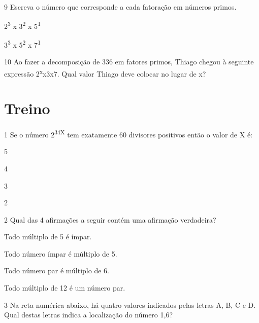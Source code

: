 \num{9} Escreva o número que corresponde a cada fatoração em números primos.

\begin{escolha}
\item 2\textsuperscript{3} x 3\textsuperscript{2} x 5\textsuperscript{1}  \\
\reduline{360\hfill}

\item 3\textsuperscript{3} x 5\textsuperscript{2} x 7\textsuperscript{1}\\
\reduline{4725\hfill}
\end{escolha}

\num{10} Ao fazer a decomposição de 336 em fatores primos, Thiago chegou
à seguinte expressão 2\textsuperscript{x}x3x7. Qual valor Thiago deve 
colocar no lugar de x?

\begin{emptybox}
\vspace{4cm}
\end{emptybox}

\pagebreak
\section*{Treino}

\num{1} Se o número 2\textsuperscript{3}\textsuperscript{4}\textsuperscript{X} tem exatamente 60 divisores positivos então o valor de X é:

\begin{escolha}
  \item 5
  \item 4
  \item 3
  \item 2
\end{escolha}

\num{2} Qual das 4 afirmações a seguir contém uma afirmação verdadeira? 

\begin{escolha}
\item
  Todo múltiplo de 5 é ímpar.
\item
  Todo número ímpar é múltiplo de 5.
\item
  Todo número par é múltiplo de 6.
\item
  Todo múltiplo de 12 é um número par. 
\end{escolha}

\num{3} Na reta numérica abaixo, há quatro valores indicados pelas
letras A, B, C e D. Qual destas letras indica a localização do número
1,6?

